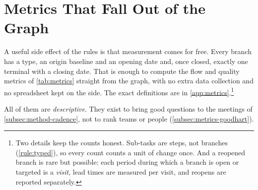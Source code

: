 \section{Metrics That Fall Out of the Graph}
\label{sec:metrics}

A useful side effect of the rules is that measurement comes for free.
Every branch has a type, an origin baseline and an opening date and, once
closed, exactly one terminal with a closing date. That is enough to compute
the flow and quality metrics of \cref{tab:metrics} straight from the
graph, with no extra data collection and no spreadsheet kept on the side.
The exact definitions are in \cref{app:metrics}.\footnote{Two details keep
the counts honest. Sub-tasks are steps, not branches (\cref{rule:typed}),
so every count counts a unit of change once. And a reopened branch is rare
but possible: each period during which a branch is open or targeted is a
\emph{visit}, lead times are measured per visit, and reopens are reported
separately.}

All of them are \emph{descriptive}. They exist to bring good questions to
the meetings of \cref{subsec:method-cadence}, not to rank teams or people
(\cref{subsec:metrics-goodhart}).

